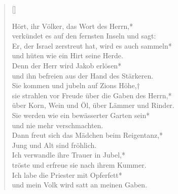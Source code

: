 
\begin{verse}[\versewidth]


Hört, ihr Völker, das Wort des Herrn,*\\
verkündet es auf den fernsten Inseln und sagt:\\ 
\vin Er, der Israel zerstreut hat, wird es auch sammeln*\\
\vin und hüten wie ein Hirt seine Herde.\\
Denn der Herr wird Jakob erlösen*\\
und ihn befreien aus der Hand des Stärkeren.\\
\vin Sie kommen und jubeln auf Zions Höhe,†\\
\vin sie strahlen vor Freude über die Gaben des Herrn,*\\ 
\vin über Korn, Wein und Öl, über Lämmer und Rinder.\\ 
Sie werden wie ein bewässerter Garten sein*\\ 
und nie mehr verschmachten.\\
\vin Dann freut sich das Mädchen beim Reigentanz,*\\
\vin Jung und Alt sind fröhlich.\\ 
Ich verwandle ihre Trauer in Jubel,*\\
tröste und erfreue sie nach ihrem Kummer.\\
\vin Ich labe die Priester mit Opferfett*\\
\vin und mein Volk wird satt an meinen Gaben.\\

\end{verse}


\def\greinitialformat#1{{\fontsize{40}{40}\selectfont #1}}
\gresetfirstlineaboveinitial{\small \textcolor{red}{Is 12}}{}
\setaboveinitialseparation{0.72mm}


